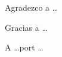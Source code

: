 \thispagestyle{abstract}
\begin{flushright}
    \vspace*{5cm}
    \medskip
    Agradezco a  \dots

    Gracias a \dots

    A \dots port \dots
\end{flushright}


